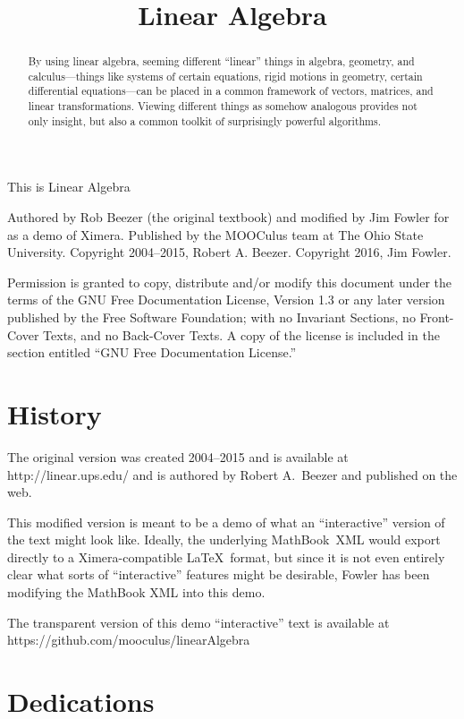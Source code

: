 \documentclass{ximera}
\title{Linear Algebra}
\begin{document}
\begin{abstract}
By using linear algebra, seeming different ``linear'' things in algebra, geometry, and calculus—things like systems of certain equations, rigid motions in geometry, certain differential equations—can be placed in a common framework of vectors, matrices, and linear transformations.  Viewing different things as somehow analogous provides not only insight, but also a common toolkit of surprisingly powerful algorithms.
\end{abstract}
\maketitle

\begin{center}
\Huge This is Linear Algebra
\end{center}

Authored by Rob Beezer (the original textbook) and modified by Jim
Fowler for as a demo of Ximera.  Published by the MOOCulus team at The
Ohio State University.  Copyright 2004--2015, Robert A. Beezer.
Copyright 2016, Jim Fowler.

Permission is granted to copy, distribute and/or modify this document
under the terms of the GNU Free Documentation License, Version 1.3 or
any later version published by the Free Software Foundation; with no
Invariant Sections, no Front-Cover Texts, and no Back-Cover Texts.  A
copy of the license is included in the section entitled ``GNU Free
Documentation License.''

\section{History}   

The original version was created 2004--2015 and is available at
http://linear.ups.edu/ and is authored by Robert A.~Beezer and
published on the web.

This modified version is meant to be a demo of what an ``interactive''
version of the text might look like.  Ideally, the underlying
MathBook~XML would export directly to a Ximera-compatible \LaTeX\
format, but since it is not even entirely clear what sorts of
``interactive'' features might be desirable, Fowler has been modifying
the MathBook XML into this demo.

The transparent version of this demo ``interactive'' text is available
at https://github.com/mooculus/linearAlgebra

\section{Dedications}
\end{document}
